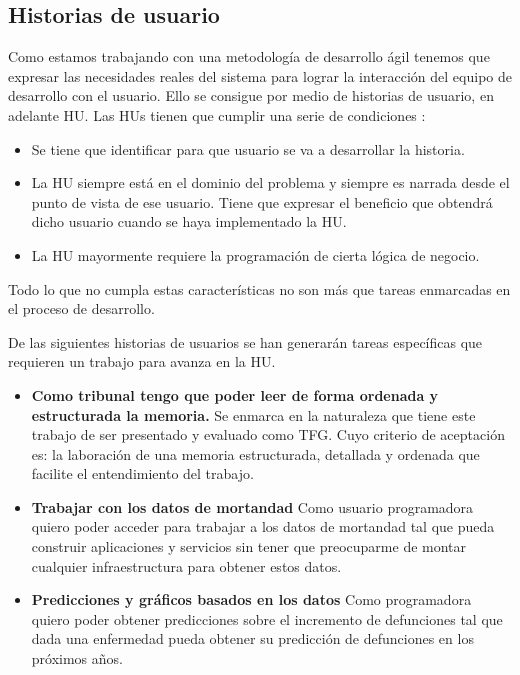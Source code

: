 \subsection{Historias de usuario}
Como estamos trabajando con una metodología de desarrollo ágil tenemos que expresar las
necesidades reales del sistema para lograr la interacción del equipo de desarrollo con el
usuario. Ello se consigue por medio de historias de usuario, en adelante HU. Las HUs
tienen que cumplir una serie de condiciones \cite{dddjj}:
\begin{itemize}
    \item Se tiene que identificar para que usuario se va a desarrollar la historia.
    \item La HU siempre está en el dominio del problema y siempre es narrada desde el
    punto de vista de ese usuario. Tiene que expresar el beneficio que obtendrá dicho
    usuario cuando se haya implementado la HU.
    \item La HU mayormente requiere la programación de cierta lógica de negocio. 
\end{itemize}
Todo lo que no cumpla estas características no son más que tareas enmarcadas en el proceso
de desarrollo.

De las siguientes historias de usuarios se han generarán tareas específicas que requieren
un trabajo para avanza en la HU.
\begin{itemize}
    \item \textbf{Como tribunal tengo que poder leer de forma ordenada y estructurada la
    memoria.} Se enmarca en la naturaleza que tiene este trabajo de ser presentado y
    evaluado como TFG. Cuyo criterio de aceptación es: la laboración de una memoria
    estructurada, detallada y ordenada que facilite el entendimiento del trabajo.

    \item \textbf{Trabajar con los datos de mortandad}
    Como usuario programadora
    quiero poder acceder para trabajar a los datos de mortandad
    tal que pueda construir aplicaciones y servicios sin tener que preocuparme de montar cualquier infraestructura para obtener estos datos.

    \item \textbf{Predicciones y gráficos basados en los datos}
    Como programadora quiero poder obtener predicciones sobre el incremento de defunciones
    tal que dada una enfermedad pueda obtener su predicción de defunciones en los próximos años.
\end{itemize}

